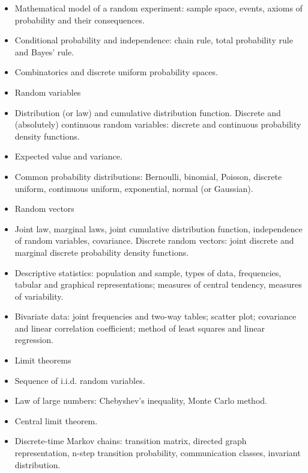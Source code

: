 \documentclass{article}
\begin{document}
\begin{itemize}
    \item Mathematical model of a random experiment: sample space, events, axioms of probability and their consequences.

    \item Conditional probability and independence: chain rule, total probability rule and Bayes' rule.

    \item Combinatorics and discrete uniform probability spaces.

    \item Random variables

    \item Distribution (or law) and cumulative distribution function.
    Discrete and (absolutely) continuous random variables: discrete and continuous probability density functions.
    \item Expected value and variance.
    \item Common probability distributions: Bernoulli, binomial, Poisson, discrete uniform, continuous uniform, exponential, normal (or Gaussian). 

    \item Random vectors

    \item Joint law, marginal laws, joint cumulative distribution function, independence of random variables, covariance.
    Discrete random vectors: joint discrete and marginal discrete probability density functions.

    \item Descriptive statistics: population and sample, types of data, frequencies, tabular and graphical representations; measures of central tendency, measures of variability.

    \item Bivariate data: joint frequencies and two-way tables; scatter plot; covariance and linear correlation coefficient; method of least squares and linear regression.

    \item Limit theorems

    \item Sequence of i.i.d. random variables.
    \item Law of large numbers: Chebyshev's inequality, Monte Carlo method.
    \item Central limit theorem.

    \item Discrete-time Markov chains: transition matrix, directed graph representation, n-step transition probability, communication classes, invariant distribution. 

\end{itemize}
\end{document}
